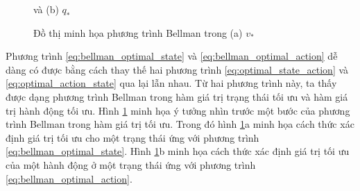 \begin{figure}
	\caption[Đồ thị minh họa phương trình Bellman trong hàm giá trị tối ưu]{Đồ thị minh họa phương trình Bellman trong (a) $v_{*}$} và (b) $q_{*}$
	\label{fig:bellman_optimal_function}
\end{figure}

Phương trình \ref{eq:bellman_optimal_state} và \ref{eq:bellman_optimal_action} dễ dàng có được bằng cách thay thế hai phương trình \ref{eq:optimal_state_action} và \ref{eq:optimal_action_state} qua lại lẫn nhau. Từ hai phương trình này, ta thấy được dạng phương trình Bellman trong hàm giá trị trạng thái tối ưu và hàm giá trị hành động tối ưu. Hình \ref{fig:bellman_optimal_function} minh họa ý tưởng nhìn trước một bước của phương trình Bellman trong hàm giá trị tối ưu. Trong đó hình \ref{fig:bellman_optimal_function}a minh họa cách thức xác định giá trị tối ưu cho một trạng thái ứng với phương trình \ref{eq:bellman_optimal_state}. Hình \ref{fig:bellman_optimal_function}b minh họa cách thức xác định giá trị tối ưu của một hành động ở một trạng thái ứng với phương trình \ref{eq:bellman_optimal_action}.

